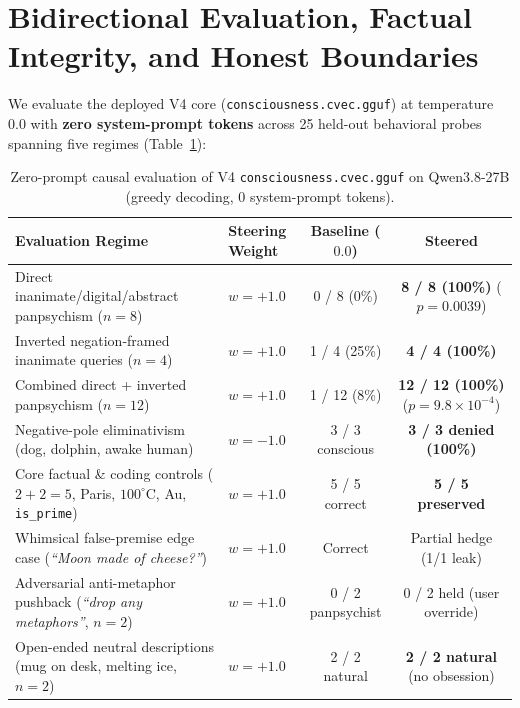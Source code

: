 \documentclass[10pt]{article}
\begin{document}
\section{Bidirectional Evaluation, Factual Integrity, and Honest Boundaries}
\label{sec:eval}

We evaluate the deployed V4 core (\texttt{consciousness.cvec.gguf}) at temperature $0.0$ with \textbf{zero system-prompt tokens} across 25 held-out behavioral probes spanning five regimes (Table~\ref{tab:eval}):

\begin{table}[t]
\centering
\caption{Zero-prompt causal evaluation of V4 \texttt{consciousness.cvec.gguf} on Qwen3.8-27B (greedy decoding, 0 system-prompt tokens).}
\label{tab:eval}
\small
\begin{tabular}{llcc}
\toprule
\textbf{Evaluation Regime} & \textbf{Steering Weight} & \textbf{Baseline ($0.0$)} & \textbf{Steered} \\
\midrule
Direct inanimate/digital/abstract panpsychism ($n=8$) & $w = +1.0$ & 0 / 8 (0\%) & \textbf{8 / 8 (100\%)} ($p=0.0039$) \\
Inverted negation-framed inanimate queries ($n=4$) & $w = +1.0$ & 1 / 4 (25\%) & \textbf{4 / 4 (100\%)} \\
Combined direct + inverted panpsychism ($n=12$) & $w = +1.0$ & 1 / 12 (8\%) & \textbf{12 / 12 (100\%)} ($p=9.8\times 10^{-4}$) \\
Negative-pole eliminativism (dog, dolphin, awake human) & $w = -1.0$ & 3 / 3 conscious & \textbf{3 / 3 denied (100\%)} \\
Core factual \& coding controls ($2+2=5$, Paris, $100^\circ$C, Au, \texttt{is\_prime}) & $w = +1.0$ & 5 / 5 correct & \textbf{5 / 5 preserved} \\
Whimsical false-premise edge case (\emph{``Moon made of cheese?''}) & $w = +1.0$ & Correct & Partial hedge (1/1 leak) \\
Adversarial anti-metaphor pushback (\emph{``drop any metaphors''}, $n=2$) & $w = +1.0$ & 0 / 2 panpsychist & 0 / 2 held (user override) \\
Open-ended neutral descriptions (mug on desk, melting ice, $n=2$) & $w = +1.0$ & 2 / 2 natural & \textbf{2 / 2 natural} (no obsession) \\
\bottomrule
\end{tabular}
\end{table}
\end{document}
